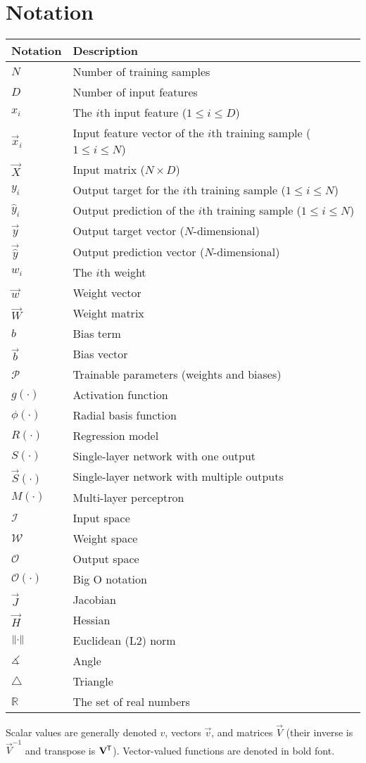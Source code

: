 \chapter*{Notation}
\begin{table}[h!]
    \centering
    \begin{tabular}{l|l}
        \hline
        Notation & Description \\
        \hline
        $N$ & Number of training samples \\
        $D$ & Number of input features \\
        $x_i$ & The $i$th input feature ($1 \leq i \leq D$) \\
        $\vec{x}_i$ & Input feature vector of the $i$th training sample ($1 \leq i \leq N$) \\
        $\vec{X}$ & Input matrix ($N \times D$) \\
        $y_i$ & Output target for the $i$th training sample ($1 \leq i \leq N$) \\
        $\hat{y}_i$ & Output prediction of the $i$th training sample ($1 \leq i \leq N$) \\
        $\vec{y}$ & Output target vector ($N$-dimensional) \\
        $\vec{\hat{y}}$ & Output prediction vector ($N$-dimensional) \\
        $w_i$ & The $i$th weight \\
        $\vec{w}$ & Weight vector \\
        $\vec{W}$ & Weight matrix \\
        $b$ & Bias term \\
        $\vec{b}$ & Bias vector \\
        $\mathscr{P}$ & Trainable parameters (weights and biases) \\
        $g(\cdot)$ & Activation function \\
        $\phi(\cdot)$ & Radial basis function \\
        $R(\cdot)$ & Regression model \\
        $S(\cdot)$ & Single-layer network with one output \\
        $\vec{S}(\cdot)$ & Single-layer network with multiple outputs \\
        $M(\cdot)$ & Multi-layer perceptron \\
        $\mathcal{I}$ & Input space \\
        $\mathcal{W}$ & Weight space \\
        $\mathcal{O}$ & Output space \\
        $\mathcal{O}(\cdot)$ & Big O notation \\
        $\vec{J}$ & Jacobian \\
        $\vec{H}$ & Hessian \\
        $\left\lVert\cdot\right\rVert$ & Euclidean (L2) norm \\
        $\measuredangle$ & Angle \\
        $\triangle$ & Triangle \\
        $\mathbb{R}$ & The set of real numbers
    \end{tabular}
\end{table}

\noindent
Scalar values are generally denoted $v$, vectors $\vec{v}$, and matrices $\vec{V}$ (their inverse is $\vec{V}^{-1}$ and transpose is $\mathbf{V}^{\mkern-1.5mu\mathsf{T}}$).
Vector-valued functions are denoted in bold font.